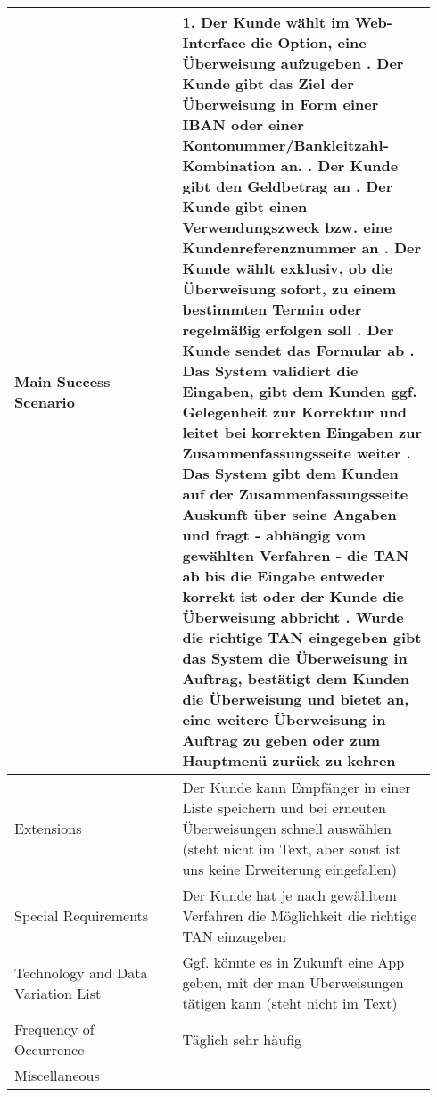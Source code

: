 \documentclass[a4paper,10pt]{article}
\begin{document}
\begin{tabular}{|p{0.37\linewidth}|p{0.57\linewidth}|}
Main Success Scenario & 1. Der Kunde wählt im Web-Interface die Option, eine Überweisung aufzugeben \newline 2. Der Kunde gibt das Ziel der Überweisung in Form einer IBAN oder einer Kontonummer/Bankleitzahl-Kombination an. \newline 3. Der Kunde gibt den Geldbetrag an \newline 4. Der Kunde gibt einen Verwendungszweck bzw. eine Kundenreferenznummer an \newline 5. Der Kunde wählt exklusiv, ob die Überweisung sofort, zu einem bestimmten Termin oder regelmäßig erfolgen soll \newline 6. Der Kunde sendet das Formular ab \newline 7. Das System validiert die Eingaben, gibt dem Kunden ggf. Gelegenheit zur Korrektur und leitet bei korrekten Eingaben zur Zusammenfassungsseite weiter \newline 8. Das System gibt dem Kunden auf der Zusammenfassungsseite Auskunft über seine Angaben und fragt \-- abhängig vom gewählten Verfahren \-- die TAN ab bis die Eingabe entweder korrekt ist oder der Kunde die Überweisung abbricht \newline 9. Wurde die richtige TAN eingegeben gibt das System die Überweisung in Auftrag, bestätigt dem Kunden die Überweisung und bietet an, eine weitere Überweisung in Auftrag zu geben oder zum Hauptmenü zurück zu kehren\\
\hline
Extensions & Der Kunde kann Empfänger in einer Liste speichern und bei erneuten Überweisungen schnell auswählen (steht nicht im Text, aber sonst ist uns keine Erweiterung eingefallen) \\
\hline
Special Requirements & Der Kunde hat je nach gewähltem Verfahren die Möglichkeit die richtige TAN einzugeben \\
\hline
Technology and Data Variation List & Ggf. könnte es in Zukunft eine App geben, mit der man Überweisungen tätigen kann (steht nicht im Text) \\
\hline
Frequency of Occurrence & Täglich sehr häufig \\
\hline
Miscellaneous & \\
\hline
\hline
\end{tabular}
\end{document}
